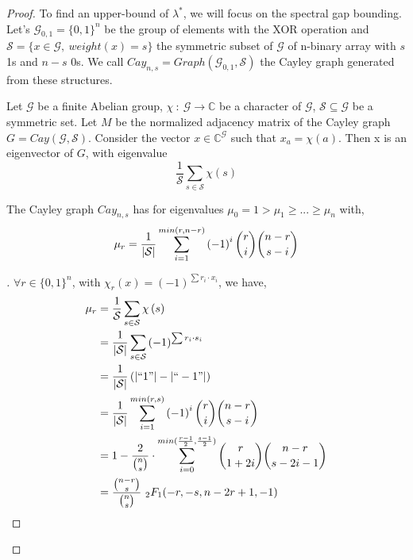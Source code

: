 \documentclass{llncs}
\newenvironment{subproof}[1][\proofname]{%
  \renewcommand{\qedsymbol}{$\blacksquare$}%
  \begin{proof}[#1]%
}{%
  \end{proof}%
}
\begin{document}
\begin{proof}
To find an upper-bound of $\lambda^*$, we will focus on the spectral gap bounding.
Let's $\mathcal{G}_{0,1}=\{0,1\}^n$ be the group of elements with the XOR operation and $\mathcal{S}=\{x \in \mathcal{G},\ weight(x)=s\}$ the symmetric subset of $\mathcal{G}$ of n-binary array with $s$ 1s and $n-s$ 0s.
We call $Cay_{n,s}=Graph\left(  \mathcal{G}_{0,1}, \mathcal{S} \right) $ the Cayley graph generated from these structures.

\begin{lemma}
Let $\mathcal{G}$ be a finite Abelian group, $\chi\ :\  \mathcal{G} \rightarrow \mathbb{C}$ be a character of $\mathcal{G}$, $\mathcal{S} \subseteq \mathcal{G}$ be a symmetric set.
Let $M$ be the normalized adjacency matrix of the Cayley graph $G = Cay(\mathcal{G},\mathcal{S})$.
Consider the vector $x \in \mathbb{C}^\mathcal{G}$ such that $x_a = \chi(a)$. Then x is an eigenvector of $G$, with eigenvalue $$ \frac{1}{\mathcal{S}} \sum_{s\in \mathcal{S}} \chi\left(s\right)$$
\end{lemma}

\begin{theorem}
The Cayley graph $Cay_{n,s}$ has for eigenvalues $\mu_0 = 1 > \mu_1 \geq ... \geq \mu_n$ with, 
$$\mu_r = \frac{1}{\left | \mathcal{S} \right |} \sum_{i=1}^{min(r, n-r)} \left ( -1 \right )^i {r \choose i}{n-r \choose s-i}\\$$
\end{theorem}

\begin{subproof}
$\forall r \in \{0,1\}^n$, with $\chi_r(x)=\left ( -1 \right )^{\sum r_i \cdot x_i}$, we have,
\begin{align*}
\mu_r &= \frac{1}{\mathcal{S}} \sum_{s\in \mathcal{S}} \chi\left(s\right) \\
&= \frac{1}{\left | \mathcal{S} \right |} \sum_{s\in \mathcal{S}} \left ( -1 \right )^{\sum r_i \cdot s_i} \\
&=  \frac{1}{\left | \mathcal{S} \right |} \left ( \left | ``1" \right | - \left | ``-1"  \right| \right ) \\
&= \frac{1}{\left | \mathcal{S} \right |} \sum_{i=1}^{min(r, s)} \left ( -1 \right )^i {r \choose i}{n-r \choose s-i} \\
&= 1 - \frac{2}{{n \choose s}} \cdot \sum_{i=0}^{min(\frac{r-1}{2}, \frac{s-1}{2})} {r \choose 1+2i}{n-r \choose s-2i-1} \\
&= \frac{{n-r \choose s}}{{n \choose s}} \ _2F_1(-r,-s,n-2r+1,-1)
\end{align*}
\end{subproof}



\end{proof}
\end{document}
